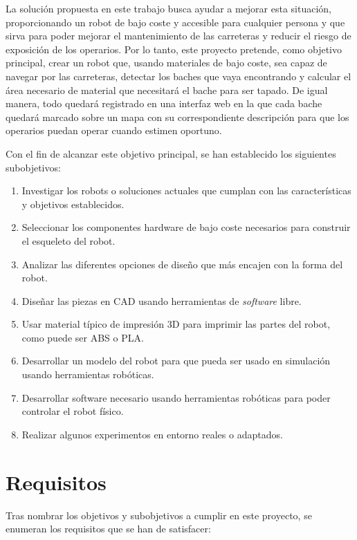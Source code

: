 La solución propuesta en este trabajo busca ayudar a mejorar esta situación, proporcionando un robot de bajo coste y accesible para cualquier persona y que sirva para poder mejorar el mantenimiento de las carreteras y reducir el riesgo de exposición de los operarios. Por lo tanto, este proyecto pretende, como objetivo principal, crear un robot que, usando materiales de bajo coste, sea capaz de navegar por las carreteras, detectar los baches que vaya encontrando y calcular el área necesario de material que necesitará el bache para ser tapado. De igual manera, todo quedará registrado en una interfaz web en la que cada bache quedará marcado sobre un mapa con su correspondiente descripción para que los operarios puedan operar cuando estimen oportuno.

Con el fin de alcanzar este objetivo principal, se han establecido los siguientes subobjetivos:

\begin{enumerate}
	\item{} Investigar los robots o soluciones actuales que cumplan con las características y objetivos establecidos.
	\item{} Seleccionar los componentes hardware de bajo coste necesarios para construir el esqueleto del robot.
	\item{} Analizar las diferentes opciones de diseño que más encajen con la forma del robot.
	\item{} Diseñar las piezas en \acs{CAD} usando herramientas de \textit{software} libre.
	\item{} Usar material típico de impresión 3D para imprimir las partes del robot, como puede ser ABS o PLA. 
	\item{} Desarrollar un modelo del robot para que pueda ser usado en simulación usando herramientas robóticas. 
	\item{} Desarrollar software necesario usando herramientas robóticas para poder controlar el robot físico. 
	\item{} Realizar algunos experimentos en entorno reales o adaptados.  
\end{enumerate}
 

\section{Requisitos}
\label{sec:requisitos}

Tras nombrar los objetivos y subobjetivos a cumplir en este proyecto, se enumeran los requisitos que se han de satisfacer: 

